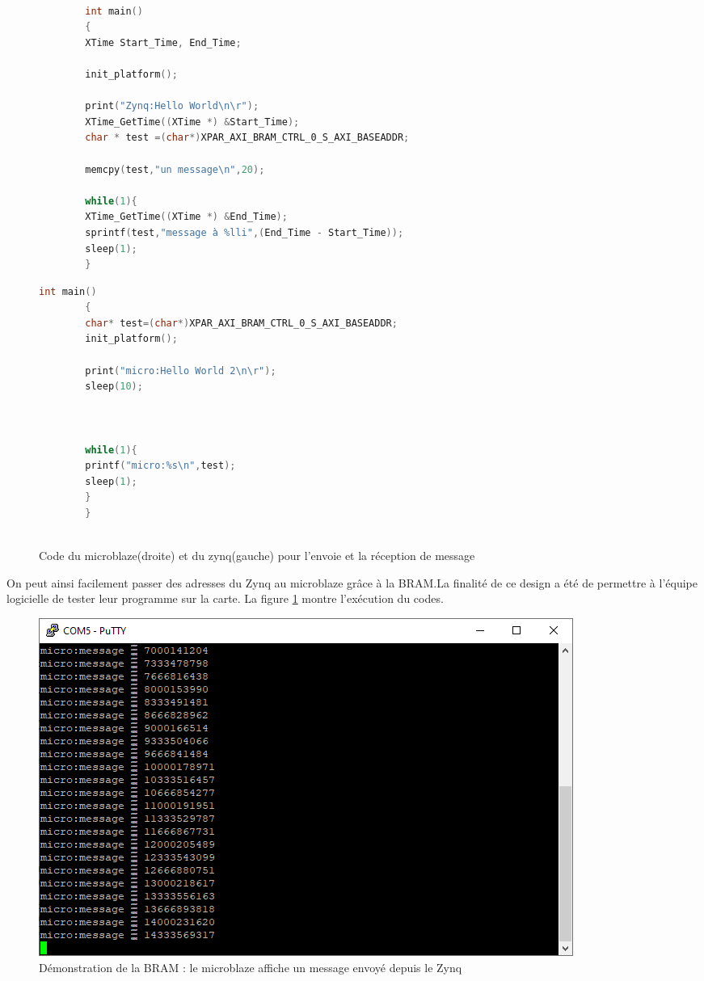 \documentclass[12pt,a4paper]{article}
\begin{document}
\begin{figure}[H]
	\begin{multicols}{2}
		\begin{lstlisting}[language=C]
		
		int main()
		{
		XTime Start_Time, End_Time;
		
		init_platform();
		
		print("Zynq:Hello World\n\r");
		XTime_GetTime((XTime *) &Start_Time);
		char * test =(char*)XPAR_AXI_BRAM_CTRL_0_S_AXI_BASEADDR;
		
		memcpy(test,"un message\n",20);
		
		while(1){
		XTime_GetTime((XTime *) &End_Time);
		sprintf(test,"message à %lli",(End_Time - Start_Time));
		sleep(1);
		}
		\end{lstlisting}	
		\bigskip
		\begin{lstlisting}[language=C]
		int main()
		{
		char* test=(char*)XPAR_AXI_BRAM_CTRL_0_S_AXI_BASEADDR;
		init_platform();
		
		print("micro:Hello World 2\n\r");
		sleep(10);
		
		
		
		while(1){
		printf("micro:%s\n",test);
		sleep(1);
		}
		}
		
		\end{lstlisting}	
	\end{multicols}		
	\caption{Code du microblaze(droite) et du zynq(gauche) pour l'envoie et la réception de message}
\end{figure}
On peut ainsi facilement passer des adresses du Zynq au microblaze grâce à la BRAM.La finalité de ce design a été de permettre à l'équipe logicielle de tester leur programme sur la carte. La figure \ref{fig-bram2} montre l'exécution du codes.
\begin{figure}[H]
	\centering
	\includegraphics[width=\linewidth]{im/bram2.png}	
	\caption{Démonstration de la BRAM : le microblaze affiche un message envoyé depuis le Zynq}
	\label{fig-bram2}
\end{figure}
\end{document}

